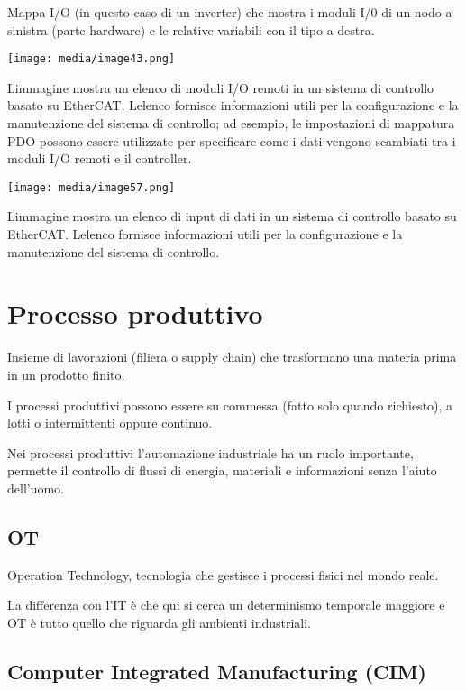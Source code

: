 Mappa I/O (in questo caso di un inverter) che mostra i moduli I/0 di un
nodo a sinistra (parte hardware) e le relative variabili con il tipo a
destra.

\texttt{[image: media/image43.png]}

L\textquotesingle immagine mostra un elenco di moduli I/O remoti in un
sistema di controllo basato su EtherCAT. L\textquotesingle elenco
fornisce informazioni utili per la configurazione e la manutenzione del
sistema di controllo; ad esempio, le impostazioni di mappatura PDO
possono essere utilizzate per specificare come i dati vengono scambiati
tra i moduli I/O remoti e il controller.

\texttt{[image: media/image57.png]}

L\textquotesingle immagine mostra un elenco di input di dati in un
sistema di controllo basato su EtherCAT. L\textquotesingle elenco
fornisce informazioni utili per la configurazione e la manutenzione del
sistema di controllo.

\section{Processo produttivo}\label{processo-produttivo}

Insieme di lavorazioni (filiera o supply chain) che trasformano una
materia prima in un prodotto finito.

I processi produttivi possono essere su commessa (fatto solo quando
richiesto), a lotti o intermittenti oppure continuo.

Nei processi produttivi l'automazione industriale ha un ruolo
importante, permette il controllo di flussi di energia, materiali e
informazioni senza l'aiuto dell'uomo.

\subsection{OT}\label{ot}

Operation Technology, tecnologia che gestisce i processi fisici nel
mondo reale.

La differenza con l'IT è che qui si cerca un determinismo temporale
maggiore e OT è tutto quello che riguarda gli ambienti industriali.

\subsection{Computer Integrated Manufacturing
(CIM)}\label{computer-integrated-manufacturing-cim}

